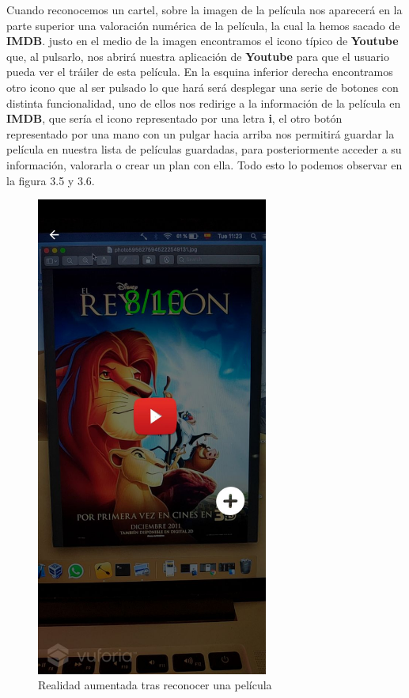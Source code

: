 Cuando reconocemos un cartel, sobre la imagen de la película nos aparecerá en la parte superior una valoración numérica de la película, la cual la hemos 
sacado de \textbf{IMDB}. justo en el medio de la imagen encontramos el icono típico de \textbf{Youtube} que, al pulsarlo, nos abrirá nuestra aplicación de \textbf{Youtube} para que
el usuario pueda ver el tráiler de esta película. En la esquina inferior derecha encontramos otro icono que al ser pulsado lo que hará será desplegar una serie de botones con distinta funcionalidad,
uno de ellos nos redirige a la información de la película en \textbf{IMDB}, que sería el icono representado por una letra \textbf{i}, el otro botón representado por una mano con un pulgar hacia arriba nos permitirá
guardar la película en nuestra lista de películas guardadas, para posteriormente acceder a su información, valorarla o crear un plan con ella. Todo esto lo podemos observar en la figura 3.5 y 3.6.
\begin{figure}[H]
    \centering
    \includegraphics[width=3in]{figures/filmrecognized1.jpg}
    \caption{Realidad aumentada tras reconocer una película}
\end{figure}
